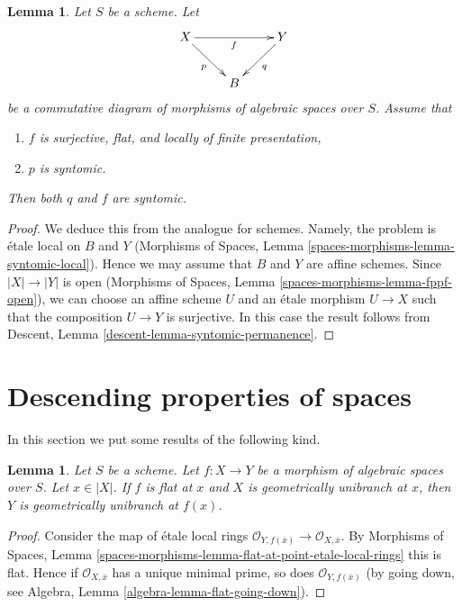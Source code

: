 \documentclass{stacks-project}
\theoremstyle{plain}
\newtheorem{lemma}[subsection]{Lemma}
\theoremstyle{definition}
\theoremstyle{remark}
\numberwithin{equation}{subsection}
\begin{document}
\begin{lemma}
\label{lemma-syntomic-permanence}
Let $S$ be a scheme. Let
$$
\xymatrix{
X \ar[rr]_f \ar[rd]_p & &
Y \ar[dl]^q \\
& B
}
$$
be a commutative diagram of morphisms of algebraic spaces over $S$. Assume that
\begin{enumerate}
\item $f$ is surjective, flat, and locally of finite presentation,
\item $p$ is syntomic.
\end{enumerate}
Then both $q$ and $f$ are syntomic.
\end{lemma}

\begin{proof}
We deduce this from the analogue for schemes.
Namely, the problem is \'etale local on $B$ and $Y$
(Morphisms of Spaces, Lemma
\ref{spaces-morphisms-lemma-syntomic-local}).
Hence we may assume that $B$ and $Y$ are affine
schemes. Since $|X| \to |Y|$ is open
(Morphisms of Spaces, Lemma \ref{spaces-morphisms-lemma-fppf-open}),
we can choose an affine
scheme $U$ and an \'etale morphism $U \to X$ such that the
composition $U \to Y$ is surjective. In this case the result
follows from Descent, Lemma
\ref{descent-lemma-syntomic-permanence}.
\end{proof}










\section{Descending properties of spaces}
\label{section-descending-properties-spaces}

\noindent
In this section we put some results of the following kind.

\begin{lemma}
\label{lemma-descend-unibranch}
Let $S$ be a scheme.
Let $f : X \to Y$ be a morphism of algebraic spaces over $S$.
Let $x \in |X|$.
If $f$ is flat at $x$ and $X$ is geometrically unibranch at $x$, then $Y$ is
geometrically unibranch at $f(x)$.
\end{lemma}

\begin{proof}
Consider the map of \'etale local rings
$\mathcal{O}_{Y, f(\overline{x})} \to \mathcal{O}_{X, \overline{x}}$.
By
Morphisms of Spaces, Lemma
\ref{spaces-morphisms-lemma-flat-at-point-etale-local-rings}
this is flat. Hence if $\mathcal{O}_{X, \overline{x}}$ has a unique minimal
prime, so does $\mathcal{O}_{Y, f(\overline{x})}$ (by going down, see
Algebra, Lemma \ref{algebra-lemma-flat-going-down}).
\end{proof}
\end{document}
